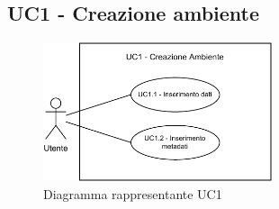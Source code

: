\newpage
\subsection{UC1 - Creazione ambiente}
\label{subsec:uc1}


\begin{figure}[h]
    \centering
    \includegraphics[width=0.6\textwidth]{componenti/casi-duso/diagrammi/UC1.pdf}
    \caption{Diagramma rappresentante UC1}
    \label{fig:UC1}
\end{figure}


